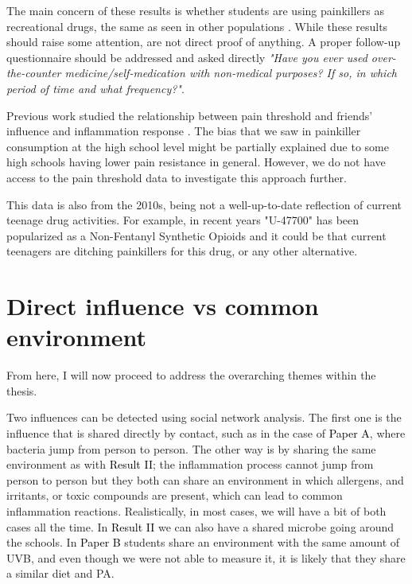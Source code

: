 
The main concern of these results is whether students are using painkillers as recreational drugs, the same as seen in other populations \cite{Sung2005}. While these results should raise some attention, are not direct proof of anything. A proper follow-up questionnaire should be addressed and asked directly \textit{"Have you ever used over-the-counter medicine/self-medication with non-medical purposes? If so, in which period of time and what frequency?"}.

 Previous work studied the relationship between pain threshold and friends' influence and inflammation response \cite{IordanovaSchistad2019}. The bias that we saw in painkiller consumption at the high school level might be partially explained due to some high schools having lower pain resistance in general. However, we do not have access to the pain threshold data to investigate this approach further.

This data is also from the 2010s, being not a well-up-to-date reflection of current teenage drug activities. For example, in recent years "U-47700" has been popularized as a Non-Fentanyl Synthetic Opioids \cite{Baumann2020} and it could be that current teenagers are ditching painkillers for this drug, or any other alternative.


\section{Direct influence vs common environment}
\label{disc:directenviroment}

From here, I will now proceed to address the overarching themes within the thesis.

Two influences can be detected using social network analysis. The first one is the influence that is shared directly by contact, such as in the case of \colorbox{PaperColor}{\textcolor{black}{Paper A}}, where bacteria jump from person to person. The other way is by sharing the same environment as with \colorbox{ResultColor}{\textcolor{black}{Result II}}; the inflammation process cannot jump from person to person but they both can share an environment in which allergens, and irritants, or toxic compounds are present, which can lead to common inflammation reactions. Realistically, in most cases, we will have a bit of both cases all the time. In \colorbox{ResultColor}{\textcolor{black}{Result II}} we can also have a shared microbe going around the schools. In \colorbox{PaperColor}{\textcolor{black}{Paper B}} students share an environment with the same amount of UVB, and even though we were not able to measure it, it is likely that they share a similar diet and PA.

